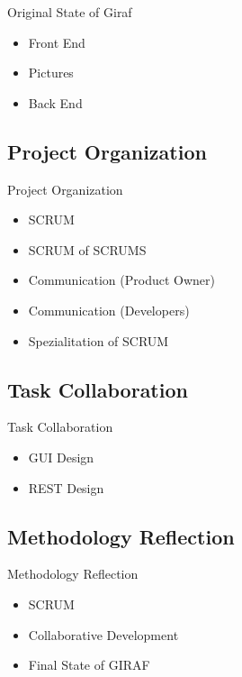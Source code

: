 \begin{frame}{Original State of Giraf}
\begin{itemize}
	\item Front End
	\item Pictures
	\item Back End
\end{itemize}
\end{frame}

\subsection{Project Organization}
\begin{frame}{Project Organization}
\begin{itemize} 
	\item SCRUM
	\item SCRUM of SCRUMS
	\item Communication (Product Owner)
	\item Communication (Developers)
	\item Spezialitation of SCRUM
\end{itemize}
\end{frame}

\subsection{Task Collaboration}
\begin{frame}{Task Collaboration}
\begin{itemize} 
	\item GUI Design
	\item REST Design
\end{itemize}
\end{frame}

\subsection{Methodology Reflection}
\begin{frame}{Methodology Reflection}
\begin{itemize} 
	\item SCRUM
	\item Collaborative Development
	\item Final State of GIRAF
\end{itemize}
\end{frame}
















